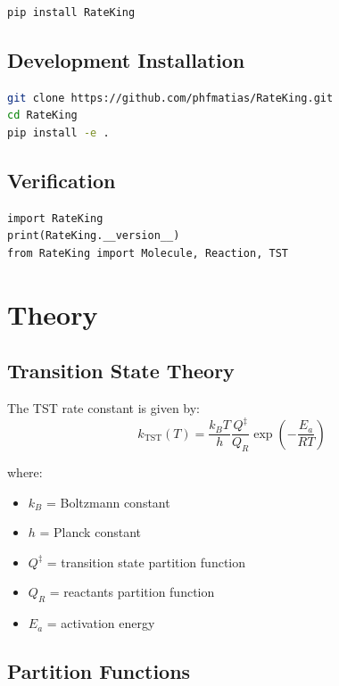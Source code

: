 \documentclass[11pt,a4paper]{book}
\begin{document}
\begin{lstlisting}[language=bash]
pip install RateKing
\end{lstlisting}

\section{Development Installation}

\begin{lstlisting}[language=bash]
git clone https://github.com/phfmatias/RateKing.git
cd RateKing
pip install -e .
\end{lstlisting}

\section{Verification}

\begin{lstlisting}
import RateKing
print(RateKing.__version__)
from RateKing import Molecule, Reaction, TST
\end{lstlisting}

\chapter{Theory}

\section{Transition State Theory}

The TST rate constant is given by:
\begin{equation}
k_{\text{TST}}(T) = \frac{k_B T}{h} \frac{Q^\ddagger}{Q_R} \exp\left(-\frac{E_a}{RT}\right)
\end{equation}

where:
\begin{itemize}
  \item $k_B$ = Boltzmann constant
  \item $h$ = Planck constant
  \item $Q^\ddagger$ = transition state partition function
  \item $Q_R$ = reactants partition function
  \item $E_a$ = activation energy
\end{itemize}

\section{Partition Functions}
\end{document}
